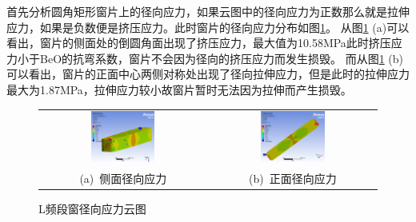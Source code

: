 \documentclass[master]{thesis-uestc}
\begin{document}
首先分析圆角矩形窗片上的径向应力，如果云图中的径向应力为正数那么就是拉伸应力，如果是负数便是挤压应力。此时窗片的径向应力分布如图\ref{fig:L频段窗径向应力}。
从图\ref{fig:L频段窗径向应力} (a)可以看出，窗片的侧面处的倒圆角面出现了挤压应力，最大值为10.58MPa此时挤压应力小于BeO的抗弯系数，窗片不会因为径向的挤压应力而发生损毁。
而从图\ref{fig:L频段窗径向应力} (b)可以看出，窗片的正面中心两侧对称处出现了径向拉伸应力，但是此时的拉伸应力最大为1.87MPa，拉伸应力较小故窗片暂时无法因为拉伸而产生损毁。
\begin{figure}[!htb]
    \small
    \centering
    \begin{tabular}{@{\ }c@{\ }c}
        \includegraphics[width=0.4\textwidth]{pic/chapter4/L径向应力侧面.png} & 
        \hspace{5pt}
        \includegraphics[width=0.4\textwidth]{pic/chapter4/L径向应力正面.png}     \\
        \mbox{\small (a) 侧面径向应力}                                                                               & 
        \mbox{\small (b) 正面径向应力}                                                                                  \\
    \end{tabular}
    \caption{L频段窗径向应力云图}
    \label{fig:L频段窗径向应力}
\end{figure}
\end{document}
